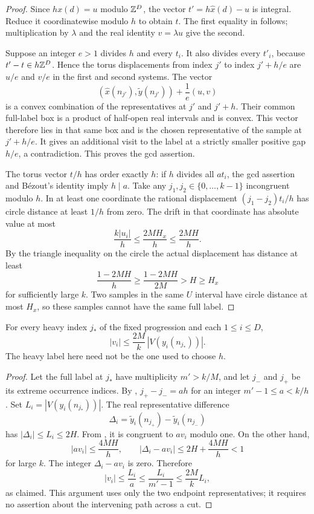 \begin{proof}
Since $h x(d)=u$ modulo $\mathbb Z^D$, the vector
$t'=h\hat x(d)-u$ is integral. Reduce it coordinatewise modulo
$h$ to obtain $t$. The first equality in
 follows; multiplication by $\lambda$
and the real identity $v=\lambda u$ give the second.

Suppose an integer $e>1$ divides $h$ and every $t_i$. It also divides
every $t'_i$, because $t'-t\in h\mathbb Z^D$. Hence the torus
displacements from index $j'$ to index $j'+h/e$ are $u/e$ and
$v/e$ in the first and second systems. The vector
\[
 (\hat x(n_{j'}),\tilde y(n_{j'}))+\frac1e(u,v)
\]
is a convex combination of the representatives at $j'$ and $j'+h$.
Their common full-label box is a product of half-open real intervals
and is convex. This vector therefore lies in that same box and is
the chosen representative of the sample at $j'+h/e$.
It gives an additional visit to the label at a strictly smaller
positive gap $h/e$, a contradiction. This proves the gcd assertion.

The torus vector $t/h$ has order exactly $h$: if $h$ divides all
$a t_i$, the gcd assertion and B\'ezout's identity imply $h\mid a$.
Take any $j_1,j_2\in\{0,\ldots,k-1\}$ incongruent modulo $h$.
In at least one coordinate the rational displacement
$(j_1-j_2)t_i/h$ has circle distance at least
$1/h$ from zero. The drift in that coordinate has absolute value at
most
\[
 \frac{k|u_i|}{h}\le\frac{2MH_x}{h}\le\frac{2MH}{h}.
\]
By the triangle inequality on the circle the actual displacement has
distance at least
\[
 \frac{1-2MH}{h}\ge\frac{1-2MH}{2M}>H\ge H_x
\]
for sufficiently large $k$. Two samples in the same $U$ interval
have circle distance at most $H_x$, so these samples cannot have
the same full label.
\end{proof}

\begin{lemma}
\label{dichotomy:heavy-width}
For every heavy index $j_*$ of the fixed progression and each
$1\le i\le D$,
\begin{equation}\label{dichotomy:relative-width}
 |v_i|\le\frac{2M}{k}\,|V(y_i(n_{j_*}))|.
\end{equation}
The heavy label here need not be the one used to choose $h$.
\end{lemma}

\begin{proof}
Let the full label at $j_*$ have multiplicity $m'>k/M$, and let
$j_-$ and $j_+$ be its extreme occurrence indices. By
, $j_+-j_-=a h$ for an integer
$m'-1\le a<k/h$. Set $L_i=|V(y_i(n_{j_*}))|$. The real
representative difference
\[
 \Delta_i=\tilde y_i(n_{j_+})-\tilde y_i(n_{j_-})
\]
has $|\Delta_i|\le L_i\le2H$. From
, it is congruent to $a v_i$
modulo one. On the other hand,
\[
 |a v_i|\le\frac{4MH}{h},\qquad
 |\Delta_i-a v_i|\le2H+\frac{4MH}{h}<1
\]
for large $k$. The integer $\Delta_i-a v_i$ is zero. Therefore
\[
 |v_i|\le\frac{L_i}{a}\le\frac{L_i}{m'-1}
 \le\frac{2M}{k}L_i,
\]
as claimed. This argument uses only the two endpoint representatives;
it requires no assertion about the intervening path across a cut.
\end{proof}


